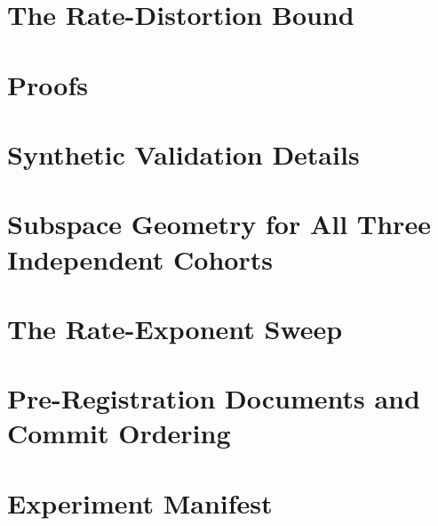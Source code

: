 \appendix
\section{The Rate-Distortion Bound}\label{app:rd}\label{sec:lower}\label{sec:lower_bound}\label{sec:achv}\label{sec:achievability}


\section{Proofs}\label{app:proofs}


\section{Synthetic Validation Details}\label{app:synthetic}


\section{Subspace Geometry for All Three Independent Cohorts}\label{app:geometry}


\section{The Rate-Exponent Sweep}\label{app:rate}


\section{Pre-Registration Documents and Commit Ordering}\label{app:prereg}



\section{Experiment Manifest}\label{app:manifest}

